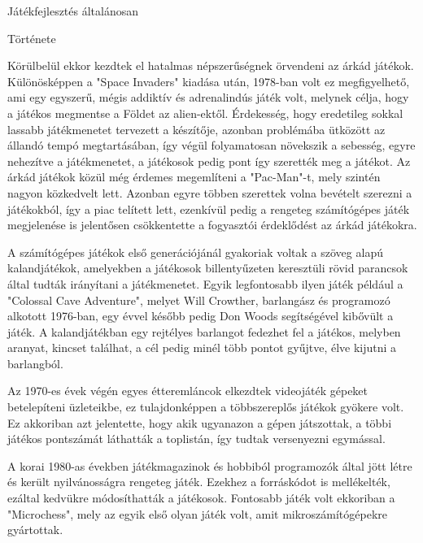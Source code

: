 \begin{MyChapter}{Játékfejlesztés általánosan}
\begin{MySection}{Története}
		
		Körülbelül ekkor kezdtek el hatalmas népszerűségnek örvendeni az árkád játékok. Különösképpen a "Space Invaders" kiadása után, 1978-ban volt ez megfigyelhető, ami egy egyszerű, mégis addiktív és adrenalindús játék volt, melynek célja, hogy a játékos megmentse a Földet az alien-ektől. Érdekesség, hogy eredetileg sokkal lassabb játékmenetet tervezett a készítője, azonban problémába ütközött az állandó tempó megtartásában, így végül folyamatosan növekszik a sebesség, egyre nehezítve a játékmenetet, a játékosok pedig pont így szerették meg a játékot. Az árkád játékok közül még érdemes megemlíteni a "Pac-Man"-t, mely szintén nagyon közkedvelt lett. Azonban egyre többen szerettek volna bevételt szerezni a játékokból, így a piac telített lett, ezenkívül pedig a rengeteg számítógépes játék megjelenése is jelentősen csökkentette a fogyasztói érdeklődést az árkád játékokra.
	
		A számítógépes játékok első generációjánál gyakoriak voltak a szöveg alapú kalandjátékok, amelyekben a játékosok billentyűzeten keresztüli rövid parancsok által tudták irányítani a játékmenetet. Egyik legfontosabb ilyen játék például a "Colossal Cave Adventure", melyet Will Crowther, barlangász és programozó alkotott 1976-ban, egy évvel később pedig Don Woods segítségével kibővült a játék. A kalandjátékban egy rejtélyes barlangot fedezhet fel a játékos, melyben aranyat, kincset találhat, a cél pedig minél több pontot gyűjtve, élve kijutni a barlangból.

		
		Az 1970-es évek végén egyes étteremláncok elkezdtek videojáték gépeket betelepíteni üzleteikbe, ez tulajdonképpen a többszereplős játékok gyökere volt. Ez akkoriban azt jelentette, hogy akik ugyanazon a gépen játszottak, a többi játékos pontszámát láthatták a toplistán, így tudtak versenyezni egymással.
		
		A korai 1980-as években játékmagazinok és hobbiból programozók által jött létre és került nyilvánosságra rengeteg játék. Ezekhez a forráskódot is mellékelték, ezáltal kedvükre módosíthatták a játékosok. Fontosabb játék volt ekkoriban a "Microchess", mely az egyik első olyan játék volt, amit mikroszámítógépekre gyártottak.
		
		

\end{MySection}
\end{MyChapter}
